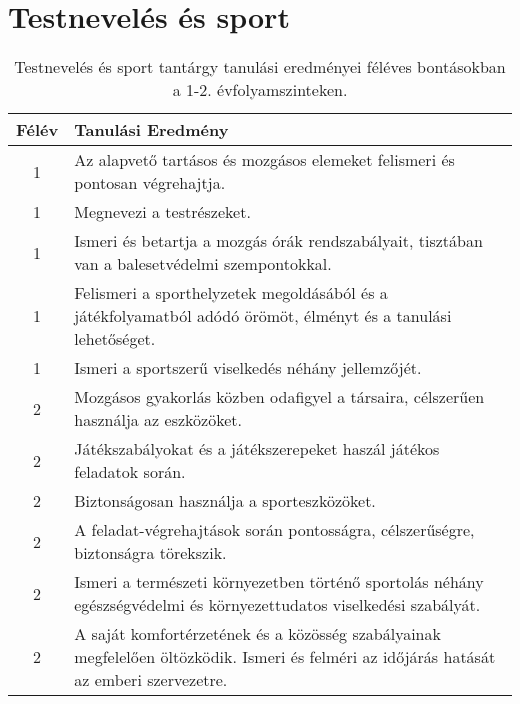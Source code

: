         \section{Testnevelés és sport}

       
           \begin{longtable}{c | p{12cm} }
            \caption[Testnevelés és sport 1-2.]{Testnevelés és sport tantárgy tanulási eredményei féléves bontásokban a 1-2. évfolyamszinteken. }  \\

            \textbf{Félév} & \textbf{Tanulási Eredmény} \\
            \hline
            \endhead
                                
                                      
                                
                                          1 &  Az alapvető tartásos és mozgásos elemeket felismeri és pontosan végrehajtja. \\ \hline
                                          1 &  Megnevezi a testrészeket. \\ \hline
                                          1 &  Ismeri és betartja a mozgás órák rendszabályait, tisztában van a balesetvédelmi szempontokkal. \\ \hline
                                          1 &  Felismeri a sporthelyzetek megoldásából és a játékfolyamatból adódó örömöt, élményt és a tanulási lehetőséget. \\ \hline
                                          1 &  Ismeri a sportszerű viselkedés néhány jellemzőjét. \\ \hline
                                      
                                
                                          2 &  Mozgásos gyakorlás közben odafigyel a társaira, célszerűen használja az eszközöket. \\ \hline
                                          2 &  Játékszabályokat és a játékszerepeket haszál játékos feladatok során. \\ \hline
                                          2 &  Biztonságosan használja a sporteszközöket. \\ \hline
                                          2 &  A feladat-végrehajtások során pontosságra, célszerűségre, biztonságra törekszik. \\ \hline
                                          2 &  Ismeri a természeti környezetben történő sportolás néhány egészségvédelmi és környezettudatos viselkedési szabályát. \\ \hline
                                          2 &  A saját komfortérzetének és a közösség szabályainak megfelelően öltözködik. Ismeri és felméri az időjárás hatását az emberi szervezetre. \\ \hline
                                      

\end{longtable}
